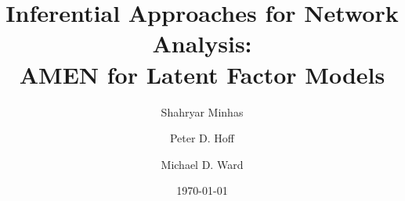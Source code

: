 \documentclass[12pt,onesided]{amsart}
\title{Inferential Approaches for Network Analysis: \\ AMEN for Latent Factor Models}
\author[Minhas]{Shahryar Minhas}
\author[Hoff]{Peter D. Hoff}
\author[Ward]{Michael D. Ward}
\date{\today}
\begin{document}
\maketitle\thispagestyle{empty}

\begin{quote}
\small{\singlespacing{}}
\end{quote}

\newpage\setcounter{page}{1} 







\newpage

\clearpage


\newpage
\end{document}
